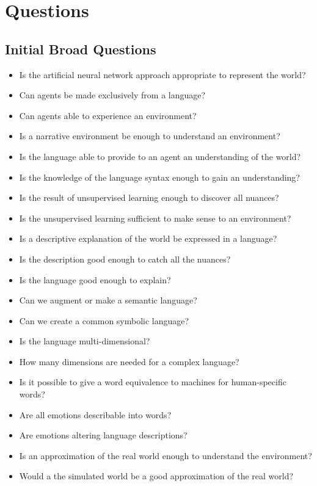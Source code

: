 \chapter{Questions}
\label{chap:questions}


\section{Initial Broad Questions}
\begin{itemize}[noitemsep]
    \item Is the artificial neural network approach appropriate to represent the world?
    \item Can agents be made exclusively from a language?
    \item Can agents able to experience an environment?
    \item Is a narrative environment be enough to understand an environment?
    \item Is the language able to provide to an agent an understanding of the world?
    \item Is the knowledge of the language syntax enough to gain an understanding?
    \item Is the result of unsupervised learning enough to discover all nuances?
    \item Is the unsupervised learning sufficient to make sense to an environment?
    \item Is a descriptive explanation of the world be expressed in a language?
    \item Is the description good enough to catch all the nuances?
    \item Is the language good enough to explain?
    \item Can we augment or make a semantic language?
    \item Can we create a common symbolic language?
    \item Is the language multi-dimensional?
    \item How many dimensions are needed for a complex language?
    \item Is it possible to give a word equivalence to machines for human-specific words?
    \item Are all emotions describable into words?
    \item Are emotions altering language descriptions?
    \item Is an approximation of the real world enough to understand the environment?
    \item Would a the simulated world be a good approximation of the real world?
\end{itemize}


